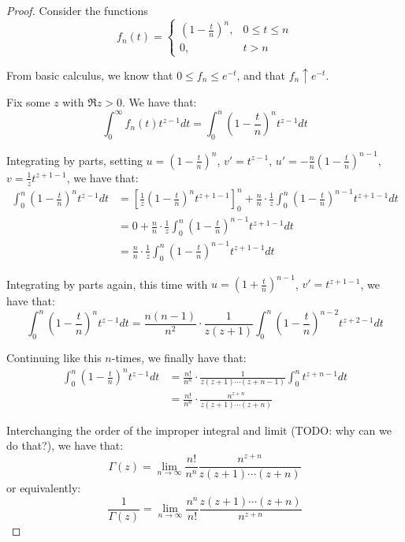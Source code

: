 \documentclass[11pt]{article} %
\theoremstyle{definition}
\begin{document}
\begin{proof}
Consider the functions
\[
f_n\left(t\right) =
\begin{cases}
\left(1-\frac{t}{n}\right)^n, & 0\leq t \leq n \\
0, & t > n
\end{cases}
\]

From basic calculus, we know that $0 \leq f_n \leq e^{-t}$, and that $f_n \uparrow e^{-t}$.

Fix some $z$ with $\Re z > 0$. We have that:
\[ \int _0^\infty f_n\left(t\right) t^{z-1} dt = \int_0^n \left(1- \frac{t}{n}\right)^n t^{z-1}dt \]

Integrating by parts, setting $u = \left(1 - \frac{t}{n}\right)^n$, $v' = t^{z-1}$, $u' = -\frac{n}{n}\left(1-\frac{t}{n}\right)^{n-1}$, $v = \frac{1}{z}t^{z+1-1}$, we have that:
\[
\begin{split}    
\int_0^n \left(1-\frac{t}{n}\right)^n t^{z-1} dt & = \left[\frac{1}{z}\left(1-\frac{t}{n}\right)^nt^{z+1 -1}\right]_0^n + \frac{n}{n}\cdot\frac{1}{z}\int_0^n \left(1-\frac{t}{n}\right)^{n-1}t^{z+1-1}dt \\
& = 0 + \frac{n}{n}\cdot\frac{1}{z}\int_0^n \left(1-\frac{t}{n}\right)^{n-1}t^{z+1-1}dt \\
& = \frac{n}{n}\cdot\frac{1}{z}\int_0^n \left(1-\frac{t}{n}\right)^{n-1}t^{z+1-1}dt
\end{split}
\]

Integrating by parts again, this time with $u = \left(1 + \frac{t}{n}\right)^{n-1}$, $v' = t^{z+1-1}$, we have that:
\[ \int_0^n \left(1-\frac{t}{n}\right)^n t^{z-1} dt = \frac{n\left(n-1\right)}{n^2}\cdot\frac{1}{z\left(z+1\right)}\int_0^n \left(1-\frac{t}{n}\right)^{n-2}t^{z+2-1}dt \]

Continuing like this $n$-times, we finally have that:
\[
\begin{split}
\int_0^n \left(1-\frac{t}{n}\right)^n t^{z-1} dt &= \frac{n!}{n^n} \cdot \frac{1}{z\left(z+1\right)\cdots\left(z+n-1\right)}\int_0^n t^{z+n-1}dt \\
& = \frac{n!}{n^n} \cdot \frac{n^{z+n}}{z\left(z+1\right)\cdots\left(z+n\right)}
\end{split}
\]

Interchanging the order of the improper integral and limit (TODO: why can we do that?), we have that:
\[ \Gamma\left(z\right) = \lim_{n\to\infty} \frac{n!}{n^n} \frac{n^{z+n}}{z\left(z+1\right)\cdots\left(z+n\right)} \] 
or equivalently:
\[ \frac{1}{\Gamma\left(z\right)} = \lim_{n\to \infty} \frac{n^n}{n!}\frac{z\left(z+1\right)\cdots\left(z+n\right)}{n^{z+n}} \]


\end{proof}
\end{document}
